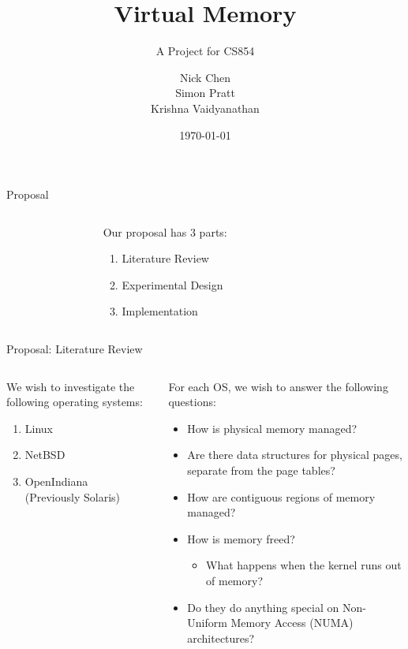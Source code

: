 \documentclass[aspectratio=169]{beamer}
\title{Virtual Memory}
\subtitle{A Project for CS854}
\author[N. Chen, S. Pratt, K. Vaidyanathan]{Nick Chen\\Simon Pratt\\%
Krishna Vaidyanathan}
\institute[UW]{University of Waterloo}
\date{\today}
\newcommand{\bi}{\begin{itemize}}
\newcommand{\ei}{\end{itemize}}
\newcommand{\bn}{\begin{enumerate}}
\newcommand{\en}{\end{enumerate}}
\begin{document}
\frame[plain]{\titlepage}

\begin{frame}{Proposal}
  \begin{columns}[T]
    \begin{column}{0.2\textwidth}
    \end{column}
    \begin{column}{0.6\textwidth}
      Our proposal has 3 parts:
      \bn
      \pause
    \item { Literature Review}
      \pause
    \item Experimental Design
      \pause
    \item Implementation
      \en
    \end{column}
    \begin{column}{0.2\textwidth}
    \end{column}
  \end{columns}
\end{frame}

\begin{frame}{Proposal: Literature Review}
  \begin{columns}[T]
    \begin{column}{0.4\textwidth}
      We wish to investigate the following operating systems:
      \bn
      \pause
    \item Linux
      \pause
    \item NetBSD
      \pause
    \item OpenIndiana\\(Previously Solaris)
      \en
    \end{column}
    \begin{column}{0.6\textwidth}
      \pause
    For each OS, we wish to answer the following questions:
    \bi
    \pause
  \item How is physical memory managed?
    \pause
  \item Are there data structures for physical pages, separate from
    the page tables?
    \pause
  \item How are contiguous regions of memory managed?
    \pause
  \item How is memory freed?
    \pause
    \bi
  \item What happens when the kernel runs out of memory?
    \ei
    \pause
  \item Do they do anything special on Non-Uniform Memory Access
    (NUMA) architectures?
    \ei
    \end{column}
  \end{columns}
\end{frame}
\end{document}
